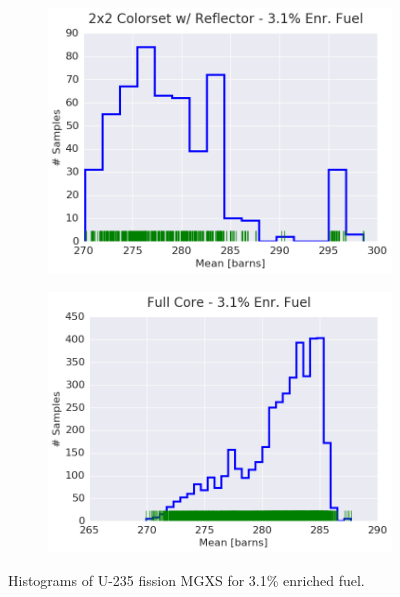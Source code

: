 \begin{figure}[h!]
\begin{subfigure}{0.5\textwidth}
  \includegraphics[width=\linewidth]{figures/patterns/reflector/hist-kde-rug/31-enr-fiss-2}  \caption{}
  \label{fig:chap9-hist-reflector-3.1-fiss}
\end{subfigure}%
\begin{subfigure}{0.5\textwidth}
  \centering
  \includegraphics[width=\linewidth]{figures/patterns/full-core/hist-kde-rug/31-enr-fiss-2} \caption{}
  \label{fig:chap9-hist-full-core-3.1-fiss}
\end{subfigure}
\caption[Histogram of U-235 fission MGXS 3.1\% enriched fuel]{Histograms of U-235 fission \ac{MGXS} for 3.1\% enriched fuel.}
\label{fig:chap9-hist-3.1-fiss}
\end{figure}


